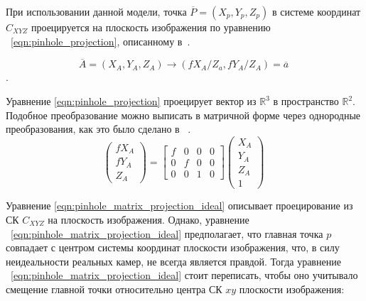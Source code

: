 \documentclass[12pt, a4paper]{article}
\begin{document}
При использовании данной модели, точка $\overline{P} = (X_p, Y_p, Z_p)$ в
системе координат $C_{XYZ}$ проецируется на плоскость изображения по уравнению
~\eqref{eqn:pinhole_projection}, описанному в~\cite{multiview_cv}.

\begin{equation}
    \overline{A} = (X_A, Y_A, Z_A) \rightarrow (fX_A/Z_a, fY_A/Z_A) = \overline{a} 
~\label{eqn:pinhole_projection}
\end{equation}.

Уравнение \eqref{eqn:pinhole_projection} проецирует вектор из $\mathbb{R}^3$ в
пространство $\mathbb{R}^2$. Подобное преобразование можно выписать в матричной
форме через однородные преобразования, как это было сделано в
~\cite{multiview_cv}.
\begin{equation}
    \begin{pmatrix}
        f X_A \\
        f Y_A \\
        Z_A
    \end{pmatrix} = 
    \begin{bmatrix}
        f & 0 & 0 & 0 \\
        0 & f & 0 & 0 \\
        0 & 0 & 1 & 0
    \end{bmatrix} \begin{pmatrix}
        X_A\\
        Y_A\\
        Z_A\\
        1
    \end{pmatrix}
~\label{eqn:pinhole_matrix_projection_ideal}
\end{equation}

\par

Уравнение \eqref{eqn:pinhole_matrix_projection_ideal} описывает проецирование из
СК $C_{XYZ}$ на плоскость изображения.  Однако, уравнение
~\eqref{eqn:pinhole_matrix_projection_ideal} предполагает, что главная точка $p$
совпадает с центром системы координат плоскости изображения, что, в силу
неидеальности реальных камер, не всегда является правдой. Тогда уравнение
~\eqref{eqn:pinhole_matrix_projection_ideal} стоит переписать, чтобы оно
учитывало смещение главной точки относительно центра СК $xy$ плоскости
изображения:
    
\end{document}
